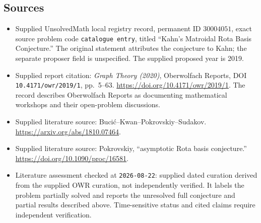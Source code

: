 \documentclass[11pt]{article}
\begin{document}
\subsection{Sources}
\begin{itemize}
\item Supplied UnsolvedMath local registry record, permanent ID \(30004051\), exact source problem code \texttt{catalogue entry}, titled ``Kahn's Matroidal Rota Basis Conjecture.'' The original statement attributes the conjecture to Kahn; the separate proposer field is unspecified. The supplied proposed year is 2019.
\item Supplied report citation: \emph{Graph Theory (2020)}, Oberwolfach Reports, DOI \texttt{10.4171/owr/2019/1}, pp.\ 5--63. \url{https://doi.org/10.4171/owr/2019/1}. The record describes Oberwolfach Reports as documenting mathematical workshops and their open-problem discussions.
\item Supplied literature source: Buci\'{c}--Kwan--Pokrovskiy--Sudakov. \url{https://arxiv.org/abs/1810.07464}.
\item Supplied literature source: Pokrovskiy, ``asymptotic Rota basis conjecture.'' \url{https://doi.org/10.1090/proc/16581}.
\item Literature assessment checked at \texttt{2026-08-22}: supplied dated curation derived from the supplied OWR curation, not independently verified. It labels the problem partially solved and reports the unresolved full conjecture and partial results described above. Time-sensitive status and cited claims require independent verification.
\end{itemize}
\end{document}
